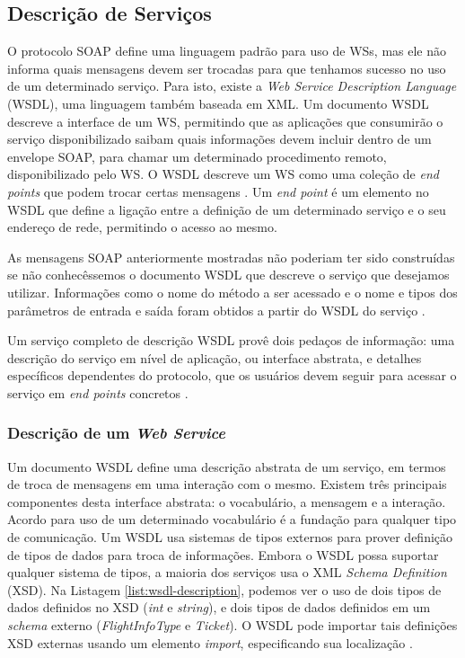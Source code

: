 \subsection{Descrição de Serviços}

O protocolo SOAP define uma linguagem padrão para uso de WSs,
mas ele não informa quais mensagens devem ser trocadas para 
que tenhamos sucesso no uso de um determinado serviço.
Para isto, existe a \textit{Web Service Description Language} (WSDL), 
uma linguagem também baseada em XML. Um documento WSDL descreve
a interface de um WS, permitindo que as aplicações
que consumirão o serviço disponibilizado saibam quais informações
devem incluir dentro de um envelope SOAP, para chamar
um determinado procedimento remoto, disponibilizado pelo WS.
O WSDL descreve um WS como uma coleção de \textit{end points}
que podem trocar certas mensagens \cite{curbera2002unraveling}. Um \textit{end point} é um
elemento no WSDL que define a ligação entre a definição de um 
determinado serviço e o seu endereço de rede, permitindo o acesso
ao mesmo.

As mensagens SOAP anteriormente mostradas não poderiam ter sido
construídas se não conhecêssemos o documento WSDL que descreve
o serviço que desejamos utilizar. Informações
como o nome do método a ser acessado e o nome e tipos dos parâmetros
de entrada e saída foram obtidos a partir do WSDL do serviço \cite{curbera2002unraveling}.

Um serviço completo de descrição WSDL provê dois pedaços de informação:
uma descrição do serviço em nível de aplicação, ou interface abstrata, e 
detalhes específicos dependentes do protocolo, que os usuários
devem seguir para acessar o serviço em \textit{end points} concretos \cite{curbera2002unraveling}.

\subsubsection{Descrição de um \textit{Web Service}}

Um documento WSDL define uma descrição abstrata de um serviço, em termos
de troca de mensagens em uma interação com o mesmo. Existem três principais
componentes desta interface abstrata: o vocabulário, a mensagem e a interação. 
Acordo para uso de um determinado vocabulário é a fundação para qualquer tipo
de comunicação. Um WSDL usa sistemas de tipos externos para prover definição
de tipos de dados para troca de informações. Embora o WSDL possa suportar
qualquer sistema de tipos, a maioria dos serviços usa o XML \textit{Schema Definition} (XSD).
Na Listagem \ref{list:wsdl-description}, podemos ver o uso de dois tipos 
de dados definidos no XSD (\textit{int} e \textit{string}), e dois tipos de dados definidos
em um \textit{schema} externo (\textit{FlightInfoType} e \textit{Ticket}).
O WSDL pode importar tais definições XSD externas usando um elemento 
\textit{import}, especificando sua localização \cite{curbera2002unraveling}.

